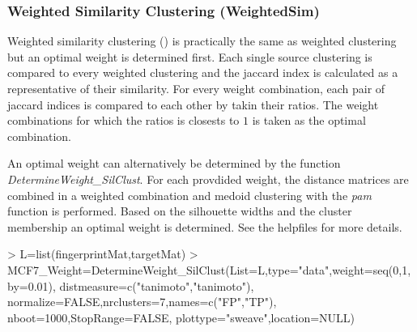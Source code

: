 \documentclass[a4paper]{article}
\begin{document}
\subsubsection{Weighted Similarity Clustering (WeightedSim)}
Weighted similarity clustering (\cite{Perualila-Tan2015}) is practically the
same as weighted clustering but an optimal weight is determined first. Each
single source clustering is compared to every weighted clustering and the
jaccard index is calculated as a representative of their similarity. For every
weight combination, each pair of jaccard indices is compared to each other by
takin their ratios. The weight combinations for which the ratios is closests to
$1$ is taken as the optimal combination.
\begin{Schunk}
\end{Schunk}
\noindent An optimal weight can alternatively be determined by the function
{\it DetermineWeight\_SilClust}. For each provdided weight, the distance
matrices are combined in a weighted combination and medoid clustering with the
{\it pam} function is performed. Based on the silhouette widths and the
cluster membership an optimal weight is determined. See the helpfiles for more details.
\begin{Schunk}
\begin{Sinput}
> L=list(fingerprintMat,targetMat)
> MCF7_Weight=DetermineWeight_SilClust(List=L,type="data",weight=seq(0,1,by=0.01),
                                      distmeasure=c("tanimoto","tanimoto"),
                                      normalize=FALSE,nrclusters=7,names=c("FP","TP"),
                                      nboot=1000,StopRange=FALSE,
                                      plottype="sweave",location=NULL)
\end{Sinput}
\end{Schunk}
\end{document}
